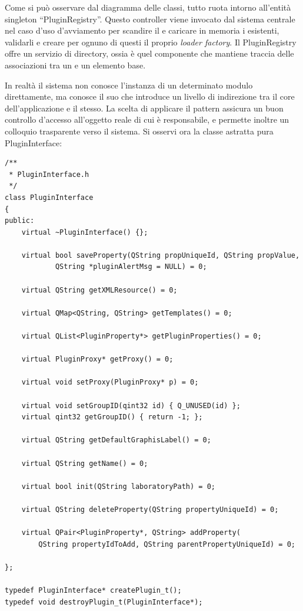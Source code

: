 Come si può osservare dal diagramma delle classi, tutto ruota intorno all'entità singleton ``PluginRegistry''. Questo controller viene invocato dal sistema centrale nel caso d'uso d'avviamento per scandire il \fs{} e caricare in memoria i \plugin{} esistenti, validarli e creare per ognuno di questi il proprio \emph{loader factory}. Il PluginRegistry offre un servizio di directory, ossia è quel componente che mantiene traccia delle associazioni tra un \plugin{} e un elemento base.

In realtà il sistema non conosce l'instanza di un determinato modulo direttamente, ma conosce il suo \proxy{} che introduce un livello di indirezione tra il core dell'applicazione e il \plugin{} stesso. La scelta di applicare il pattern \proxy{}\cite{SSA06} assicura un buon controllo d'accesso all'oggetto reale di cui è responsabile, e permette inoltre un colloquio trasparente verso il sistema. Si osservi ora la classe astratta pura PluginInterface:
\begin{lstlisting}
/**
 * PluginInterface.h
 */
class PluginInterface
{
public:
	virtual ~PluginInterface() {};

	virtual bool saveProperty(QString propUniqueId, QString propValue,
			QString *pluginAlertMsg = NULL) = 0;

	virtual QString getXMLResource() = 0;

	virtual QMap<QString, QString> getTemplates() = 0;
	
	virtual QList<PluginProperty*> getPluginProperties() = 0;

	virtual PluginProxy* getProxy() = 0;

	virtual void setProxy(PluginProxy* p) = 0;

	virtual void setGroupID(qint32 id) { Q_UNUSED(id) };
	virtual qint32 getGroupID() { return -1; };

	virtual QString getDefaultGraphisLabel() = 0;

	virtual QString getName() = 0;

	virtual bool init(QString laboratoryPath) = 0;
	
	virtual QString deleteProperty(QString propertyUniqueId) = 0;
	
	virtual QPair<PluginProperty*, QString> addProperty(
		QString propertyIdToAdd, QString parentPropertyUniqueId) = 0;
	
};

typedef PluginInterface* createPlugin_t();
typedef void destroyPlugin_t(PluginInterface*);
\end{lstlisting}

